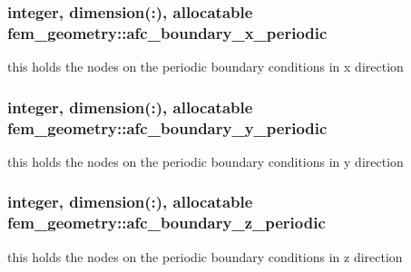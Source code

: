 \subsubsection[{afc\+\_\+boundary\+\_\+x\+\_\+periodic}]{\setlength{\rightskip}{0pt plus 5cm}integer, dimension(\+:), allocatable fem\+\_\+geometry\+::afc\+\_\+boundary\+\_\+x\+\_\+periodic}\label{classfem__geometry_a05ff2f67adfb0c3d1075709011f86a07}


this holds the nodes on the periodic boundary conditions in x direction 

\hypertarget{classfem__geometry_aee47a709c80c5c2f1c97439b877014c5}{}
\subsubsection[{afc\+\_\+boundary\+\_\+y\+\_\+periodic}]{\setlength{\rightskip}{0pt plus 5cm}integer, dimension(\+:), allocatable fem\+\_\+geometry\+::afc\+\_\+boundary\+\_\+y\+\_\+periodic}\label{classfem__geometry_aee47a709c80c5c2f1c97439b877014c5}


this holds the nodes on the periodic boundary conditions in y direction 

\hypertarget{classfem__geometry_ae3a7dff93ccfa3f2c34ddb20b0be1389}{}
\subsubsection[{afc\+\_\+boundary\+\_\+z\+\_\+periodic}]{\setlength{\rightskip}{0pt plus 5cm}integer, dimension(\+:), allocatable fem\+\_\+geometry\+::afc\+\_\+boundary\+\_\+z\+\_\+periodic}\label{classfem__geometry_ae3a7dff93ccfa3f2c34ddb20b0be1389}


this holds the nodes on the periodic boundary conditions in z direction 

\hypertarget{classfem__geometry_a9a7514f02cd379a92b365cf0ef34b9c6}{}
